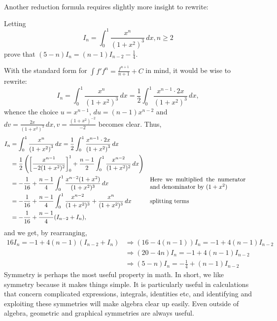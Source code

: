 \documentclass[../jarvis.tex]{subfiles}
\begin{document}
Another reduction formula requires slightly more insight to rewrite:
\begin{example}
Letting 
$$I_n=\int_{0}^{1}\frac{x^n}{\left(1+x^2\right)^3} \,dx, n\geq 2$$
prove that $(5-n)I_n=(n-1)I_{n-2}-\frac{1}{4}$.
\end{example}
With the standard form for $\int f'f^n=\frac{f^{n+1}}{n+1}+C$ in mind, it would be wise to rewrite:
$$I_n=\int_{0}^{1}\frac{x^n}{\left(1+x^2\right)^3} \,dx
    =\frac{1}{2}\int_{0}^1\frac{x^{n-1}\cdot2x}{\left(1+x^2\right)^3} \,dx,$$
    whence the choice $u=x^{n-1}, \,du=(n-1)x^{n-2}$ and $dv=\frac{2x}{(1+x^2)^3} \,dx, v=\frac{(1+x^2)^{-2}}{-2}$ becomes clear.
Thus,
\begin{align*}
    I_n &=\int_{0}^{1}\frac{x^n}{\left(1+x^2\right)^3} \,dx
    =\frac{1}{2}\int_{0}^1\frac{x^{n-1}\cdot2x}{\left(1+x^2\right)^3} \,dx \\
    &=\frac{1}{2}\left(\left[\frac{x^{n-1}}{-2(1+x^2)^2}\right]_{0}^{1}+\frac{n-1}{2}\int_{0}^{1}\frac{x^{n-2}}{(1+x^2)^2}\,dx\right) \\
    &=-\frac{1}{16}+\frac{n-1}{4}\int_{0}^{1}\frac{x^{n-2}(1+x^2)}{(1+x^2)^3}\,dx &&\parbox{5.5cm}{Here we multiplied the numerator and denominator by $(1+x^2)$}\\
    &=-\frac{1}{16}+\frac{n-1}{4}\int_{0}^{1}\frac{x^{n-2}}{(1+x^2)^3}+\frac{x^n}{(1+x^2)^3}\,dx &&\text{splitting terms}\\
    &=-\frac{1}{16}+\frac{n-1}{4}(I_{n-2}+I_n),
\end{align*}
and we get, by rearranging, 
\begin{align*}
    16I_n=-1+4(n-1)(I_{n-2}+I_n) &\Longrightarrow (16-4(n-1))I_n=-1+4(n-1)I_{n-2} \\ &\Longrightarrow (20-4n)I_n=-1+4(n-1)I_{n-2} \\ &\Longrightarrow (5-n)I_n=-\frac{1}{4}+(n-1)I_{n-2}
\end{align*}
Symmetry is perhaps the most useful property in math. In short, we like symmetry because it makes things simple. It is particularly useful in calculations that concern complicated expressions, integrals, identities etc, and identifying and exploiting these symmetries will make algebra clear up easily. Even outside of algebra, geometric and graphical symmetries are always useful.
\end{document}
